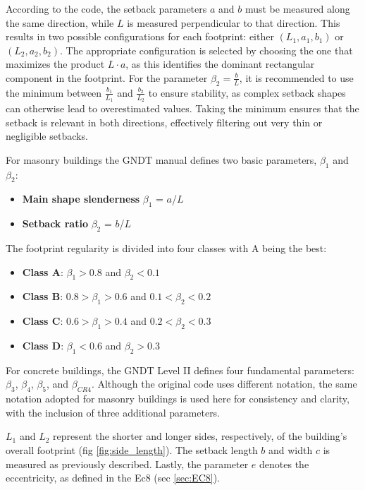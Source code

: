 \begin{refsection}
According to the code, the setback parameters $a$ and $b$ must be measured along the same direction, while $L$ is measured perpendicular to that direction. This results in two possible configurations for each footprint: either $(L_1, a_1, b_1)$ or $(L_2, a_2, b_2)$. The appropriate configuration is selected by choosing the one that maximizes the product \( L \cdot a \), as this identifies the dominant rectangular component in the footprint. For the parameter \( \beta_2 = \frac{b}{L} \), it is recommended to use the minimum between \( \frac{b_1}{L_1} \) and \( \frac{b_2}{L_2} \) to ensure stability, as complex setback shapes can otherwise lead to overestimated values. Taking the minimum ensures that the setback is relevant in both directions, effectively filtering out very thin or negligible setbacks.


For masonry buildings the GNDT manual defines two basic parameters, $\beta_1$ and $\beta_2$:

\begin{itemize}
    \item \textbf{Main shape slenderness} $\beta_1$ = $a$/$L$
    \item \textbf{Setback ratio} $\beta_2$ = $b$/$L$
\end{itemize}

The footprint regularity is divided into four classes with A being the best: 

\begin{itemize}
    \item \textbf{Class A}: $\beta_1 > 0.8$ and $\beta_2 < 0.1$
    \item \textbf{Class B}: $0.8 > \beta_1 > 0.6$ and $0.1 < \beta_2 < 0.2$
    \item \textbf{Class C}: $0.6 > \beta_1 > 0.4$ and $0.2 < \beta_2 < 0.3$
    \item \textbf{Class D}: $\beta_1 < 0.6$ and $\beta_2 > 0.3$
\end{itemize}

For concrete buildings, the GNDT Level II defines four fundamental parameters: $\beta_3$, $\beta_4$, $\beta_5$, and $\beta_{CR4}$. Although the original code uses different notation, the same notation adopted for masonry buildings is used here for consistency and clarity, with the inclusion of three additional parameters.

$L_1$ and $L_2$ represent the shorter and longer sides, respectively, of the building's overall footprint (fig \ref{fig:side_length}). The setback length $b$ and width $c$ is measured as previously described. Lastly, the parameter $e$ denotes the eccentricity, as defined in the Ec8 (sec \ref{sec:EC8}).



\end{refsection}

